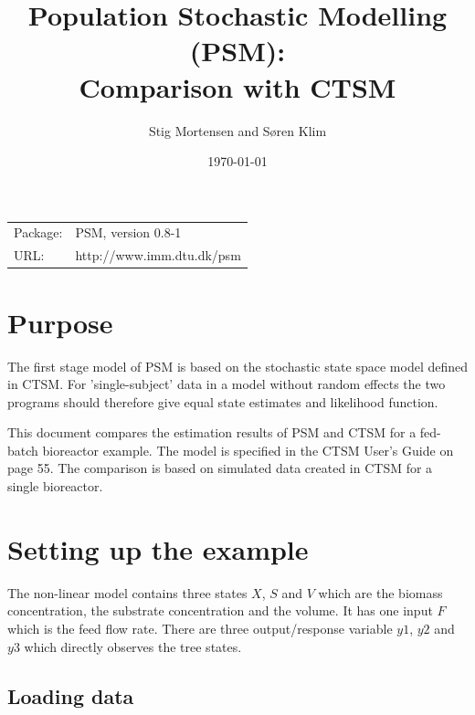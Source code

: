 \documentclass{article}
\begin{document}
\title{Population Stochastic Modelling (PSM): \\
Comparison with CTSM} 

\date{\today}

\author{Stig Mortensen and S\o ren Klim}
\maketitle

\begin{center}
\begin{tabular}{lp{6cm}}
Package:& PSM, version 0.8-1\\
URL:    & http://www.imm.dtu.dk/psm 
\end{tabular}
\end{center}

\vspace{.2cm}

\tableofcontents

\vspace{.2cm}


\section{Purpose}

The first stage model of PSM is based on the stochastic state space
model defined in CTSM. For 'single-subject' data in a model without
random effects the two programs should therefore give equal state
estimates and likelihood function.

This document compares the estimation results of PSM and
CTSM\cite{kristensen03} for a fed-batch bioreactor example. The model
is specified in the CTSM User's Guide\cite{kristensen03b} on page 55.
The comparison is based on simulated data created in CTSM for a single
bioreactor.

\newpage

\section{Setting up the example}

The non-linear model contains three states $X$, $S$ and $V$ which are
the biomass concentration, the substrate concentration and the volume.
It has one input $F$ which is the feed flow rate. There are three
output/response variable $y1$, $y2$ and $y3$ which directly observes
the tree states.

\subsection{Loading data}
\end{document}
